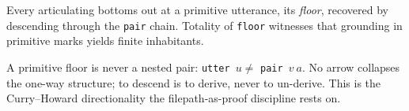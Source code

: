 \begin{proposition}[Floor]
  \label{thm:floor}
  \leanok
  Every articulating bottoms out at a primitive utterance, its \emph{floor},
  recovered by descending through the \texttt{pair} chain. Totality of
  \texttt{floor} witnesses that grounding in primitive marks yields finite
  inhabitants.
\end{proposition}

\begin{lemma}
  \label{lem:articulating-oneway}
  \leanok
  A primitive floor is never a nested pair:
  \texttt{utter}~$u \neq$ \texttt{pair}~$v~a$. No arrow collapses the one-way
  structure; to descend is to derive, never to un-derive. This is the
  Curry--Howard directionality the filepath-as-proof discipline rests on.
\end{lemma}
